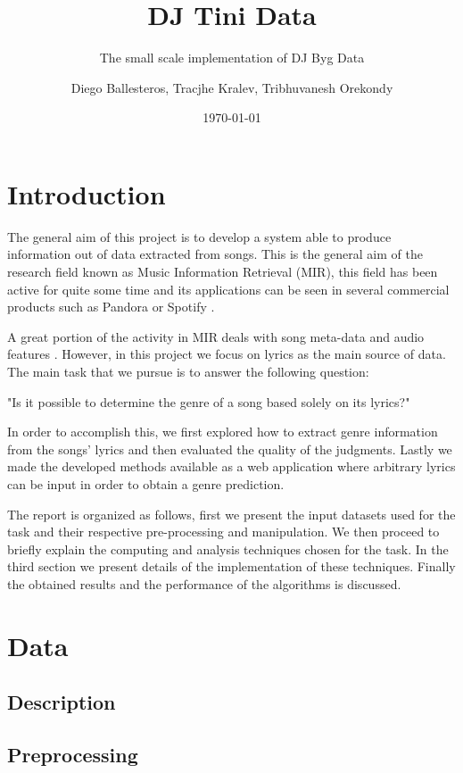 \documentclass[11pt,a4paper,twoside]{scrartcl}
\author{Diego Ballesteros, Tracjhe Kralev, Tribhuvanesh Orekondy}
\title{DJ Tini Data}
\subtitle{The small scale implementation of DJ Byg Data}
\date{\today}
\begin{document}
  \maketitle
  \section{Introduction}
    The general aim of this project is to develop a system able to produce
    information out of data extracted from songs. This is the general
    aim of the research field known as Music Information Retrieval (MIR),
    this field has been active for quite some time \cite{nameThatTune:1993}
    and its applications can be seen in several commercial products such as
    Pandora or Spotify \cite{recommendation:2010}.

    A great portion of the activity in MIR deals with song meta-data and audio
    features \cite{McFee:2012:MSD:2187980.2188222}. However, in this project we
    focus on lyrics as the main source of data.
    The main task that we pursue is to answer the following question:
    
    "Is it possible to determine the genre of a song based solely on its
    lyrics?"
     
    In order to accomplish this, we first explored how to extract genre
    information from the songs' lyrics and then evaluated the quality of the
    judgments. Lastly we made the developed methods available as a web
    application where arbitrary lyrics can be input in order to obtain
    a genre prediction.
    
    The report is organized as follows, first we present the input datasets used
    for the task and their respective pre-processing and manipulation. We then
    proceed to briefly explain the computing and analysis techniques chosen for
    the task. In the third section we present details of the implementation of
    these techniques. Finally the obtained results and the performance of the
    algorithms is discussed.
  \section{Data}
    \subsection{Description}
    \subsection{Preprocessing}
\end{document}
